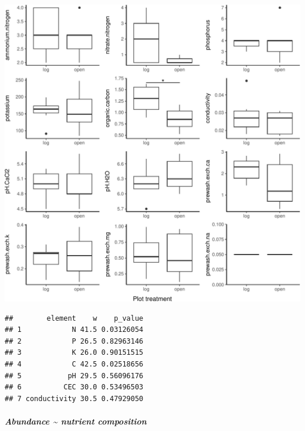 \documentclass[
]{article}
\begin{document}
\includegraphics{log-project-aubrie-winnie_files/figure-latex/unnamed-chunk-9-1.pdf}

\begin{verbatim}
##        element    w    p_value
## 1            N 41.5 0.03126054
## 2            P 26.5 0.82963146
## 3            K 26.0 0.90151515
## 4            C 42.5 0.02518656
## 5           pH 29.5 0.56096176
## 6          CEC 30.0 0.53496503
## 7 conductivity 30.5 0.47929050
\end{verbatim}

\hypertarget{abundance-nutrient-composition}{%
\subparagraph{Abundance \textasciitilde{} nutrient
composition}\label{abundance-nutrient-composition}}
\end{document}
